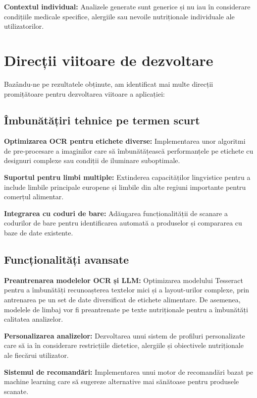 \textbf{Contextul individual:} Analizele generate sunt generice și nu iau în considerare condițiile medicale specifice, alergiile sau nevoile nutriționale individuale ale utilizatorilor.

\section{Direcții viitoare de dezvoltare}

Bazându-ne pe rezultatele obținute, am identificat mai multe direcții promițătoare pentru dezvoltarea viitoare a aplicației:

\subsection{Îmbunătățiri tehnice pe termen scurt}

\textbf{Optimizarea OCR pentru etichete diverse:} Implementarea unor algoritmi de pre-procesare a imaginilor care să îmbunătățească performanțele pe etichete cu designuri complexe sau condiții de iluminare suboptimale.

\textbf{Suportul pentru limbi multiple:} Extinderea capacităților lingvistice pentru a include limbile principale europene și limbile din alte regiuni importante pentru comerțul alimentar.

\textbf{Integrarea cu coduri de bare:} Adăugarea funcționalității de scanare a codurilor de bare pentru identificarea automată a produselor și compararea cu baze de date existente.

\subsection{Funcționalități avansate}

\textbf{Preantrenarea modelelor OCR și LLM:} Optimizarea modelului Tesseract pentru a îmbunătăți recunoașterea textelor mici și a layout-urilor complexe, prin antrenarea pe un set de date diversificat de etichete alimentare. De asemenea, modelele de limbaj vor fi preantrenate pe texte nutriționale pentru a îmbunătăți calitatea analizelor.

\textbf{Personalizarea analizelor:} Dezvoltarea unui sistem de profiluri personalizate care să ia în considerare restricțiile dietetice, alergiile și obiectivele nutriționale ale fiecărui utilizator.

\textbf{Sistemul de recomandări:} Implementarea unui motor de recomandări bazat pe machine learning care să sugereze alternative mai sănătoase pentru produsele scanate.

